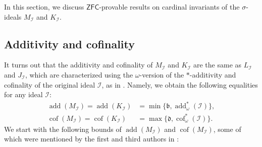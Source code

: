 \documentclass[a4paper,12pt]{amsart}
\theoremstyle{definition}
\numberwithin{thm}{section}
\numberwithin{equation}{section}
\newcommand{\bb}{\mathfrak{b}}
\newcommand{\dd}{\mathfrak{d}}
\DeclareMathOperator{\add}{add}
\DeclareMathOperator{\cof}{cof}
\newcommand{\I}{\mathscr{I}}
\begin{document}
    In this section, we discuss $\mathsf{ZFC}$-provable results on cardinal invariants of the $\sigma$-ideals $M_\I$ and $K_\I$.

    
    \subsection{Additivity and cofinality}\label{sec:add_cof}

    It turns out that the additivity and cofinality of $M_\I$ and $K_\I$ are the same as $L_\I$ and $J_\I$, which are characterized using the $\omega$-version of the $*$-additivity and cofinality of the original ideal $\I$, as in . Namely, we obtain the following equalities for any ideal $\I$:
    \begin{align*}
        \add(M_\I) = \add(K_\I)&= \min\{\bb, \add^*_\omega(\I)\},\\ 
             \cof(M_\I) = \cof(K_\I) &= \max\{\dd, \cof^*_\omega(\I)\}.
    \end{align*}
    We start with the following bounds of $\add(M_\I)$ and $\cof(M_\I)$, some of which were mentioned by the first and third authors in \cite{CM25}:
    
\end{document}
